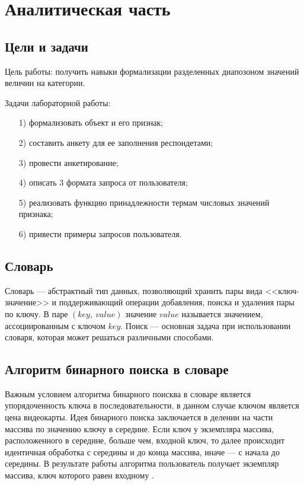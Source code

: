 \chapter{Аналитическая часть}

\section{Цели и задачи}

Цель работы: получить навыки формализации разделенных диапозоном значений величин на категории.

Задачи лабораторной работы:
\begin{enumerate}
	\item[1)] формализовать объект и его признак;
	\item[2)] составить анкету для ее заполнения респондетами;
	\item[3)] провести анкетирование;
	\item[4)] описать 3 формата запроса от пользователя;
	\item[5)] реализовать функцию принадлежности термам числовых значений признака;
	\item[6)] привести примеры запросов пользователя.
\end{enumerate}

\section{Словарь}

Словарь --- абстрактный тип данных, позволяющий хранить пары вида <<ключ-значение>> и поддерживающий операции добавления, поиска и удаления пары по ключу. 
В паре $(key,~value)$ значение $value$ называется значением, ассоциированным с ключом $key$. 
Поиск --- основная задача при использовании словаря, которая может решаться различными способами.

\section{Алгоритм бинарного поиска в словаре}

Важным условием алгоритма бинарного поисква в словаре является упорядоченность  ключа в последовательности, в данном случае ключом является цена видеокарты.
Идея бинарного поиска заключается в делении на части массива по значению ключу в середине.
Если ключ у экземпляра массива, расположенного в середине, больше чем, входной ключ, то далее происходит идентичная обработка с середины и до конца массива, иначе --- с начала до середины.
В результате работы алгоритма пользователь получает экземпляр массива, ключ которого равен входному \cite{bins}.

